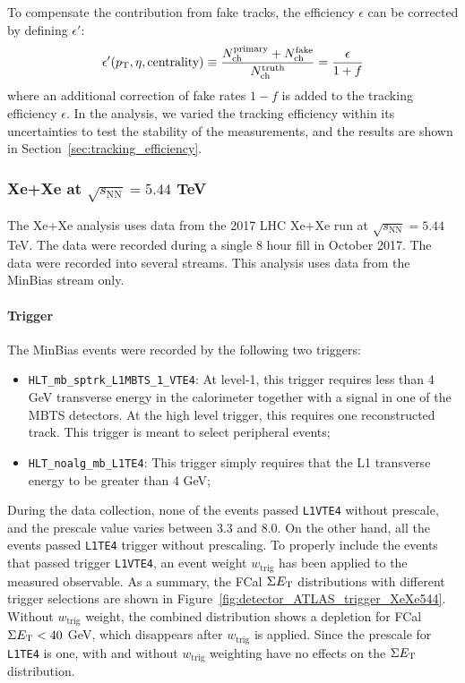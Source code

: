 To compensate the contribution from fake tracks, the efficiency $\epsilon$ can be corrected by defining $\epsilon'$:
\begin{equation}
\epsilon'(p_\text{T}, \eta, \text{centrality}) \equiv \frac{N_\text{ch}^\text{primary} + N_\text{ch}^\text{fake}}{N_\text{ch}^\text{truth}} = \frac{\epsilon}{1+f}
\end{equation}
where an additional correction of fake rates $1-f$ is added to the tracking efficiency $\epsilon$. In the analysis, we varied the tracking efficiency within its uncertainties to test the stability of the measurements, and the results are shown in Section~\ref{sec:tracking_efficiency}.



\subsubsection{Xe+Xe at $\sqrt{s_\text{NN}}=5.44$ TeV}

The Xe+Xe analysis uses data from the 2017 LHC Xe+Xe run at $\sqrt{s_\text{NN}}=5.44$ TeV. The data were recorded during a single 8 hour fill in October 2017. The data were recorded into several streams. This analysis uses data from the MinBias stream only.



\paragraph{Trigger}

The MinBias events were recorded by the following two triggers:
\begin{itemize}
\item \verb|HLT_mb_sptrk_L1MBTS_1_VTE4|: At level-1, this trigger requires less than 4 GeV transverse energy in the calorimeter together with a signal in one of the MBTS detectors. At the high level trigger, this requires one reconstructed track. This trigger is meant to select peripheral events;
\item \verb|HLT_noalg_mb_L1TE4|: This trigger simply requires that the L1 transverse energy to be greater than 4 GeV;
\end{itemize}

During the data collection, none of the events passed \verb|L1VTE4| without prescale, and the prescale value varies between 3.3 and 8.0. On the other hand, all the events passed \verb|L1TE4| trigger without prescaling. To properly include the events that passed trigger \verb|L1VTE4|, an event weight $w_\text{trig}$ has been applied to the measured observable. As a summary, the FCal $\Sigma E_\text{T}$ distributions with different trigger selections are shown in Figure~\ref{fig:detector_ATLAS_trigger_XeXe544}. Without $w_\text{trig}$ weight, the combined distribution shows a depletion for FCal $\Sigma E_\text{T}<40$ GeV, which disappears after $w_\text{trig}$ is applied. Since the prescale for \verb|L1TE4| is one, with and without $w_\text{trig}$ weighting have no effects on the $\Sigma E_\text{T}$ distribution.

